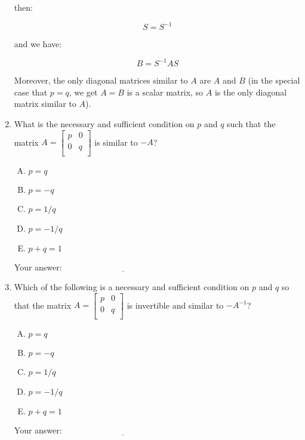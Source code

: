 \documentclass[10pt]{amsart}
\begin{document}
\begin{enumerate}
then:

$$S = S^{-1}$$

and we have:

$$B = S^{-1}AS$$

Moreover, the only diagonal matrices similar to $A$ are $A$ and $B$
(in the special case that $p = q$, we get $A = B$ is a scalar matrix,
so $A$ is the only diagonal matrix similar to $A$).

\item What is the necessary and sufficient condition on $p$ and $q$
  such that the matrix $A = \left[\begin{matrix} p & 0 \\ 0 & q
      \\\end{matrix}\right]$ is similar to $-A$?

  \begin{enumerate}[(A)]
  \item $p = q$
  \item $p = -q$
  \item $p = 1/q$
  \item $p = -1/q$
  \item $p + q = 1$
  \end{enumerate}

  \vspace{0.1in}
  Your answer: $\underline{\qquad\qquad\qquad\qquad\qquad\qquad\qquad}$
  \vspace{0.1in}

\item Which of the following is a necessary and sufficient condition
  on $p$ and $q$ so that the matrix $A = \left[\begin{matrix} p & 0
      \\ 0 & q \\\end{matrix}\right]$ is invertible and similar to
  $-A^{-1}$?

  \begin{enumerate}[(A)]
  \item $p = q$
  \item $p = -q$
  \item $p = 1/q$
  \item $p = -1/q$
  \item $p + q = 1$
  \end{enumerate}

  \vspace{0.1in}
  Your answer: $\underline{\qquad\qquad\qquad\qquad\qquad\qquad\qquad}$
  \vspace{0.5in}


\end{enumerate}
\end{document}
